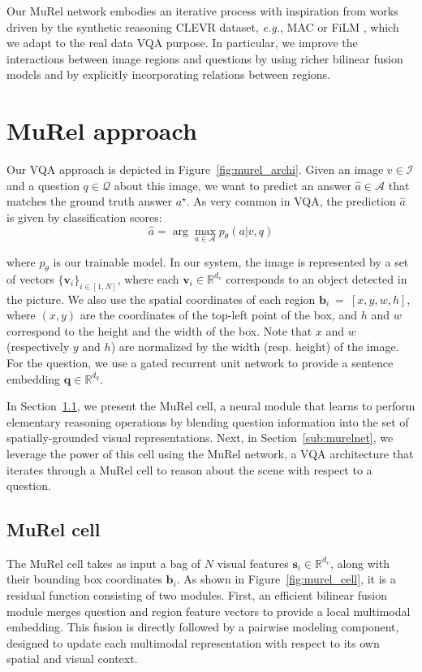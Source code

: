\documentclass[10pt,twocolumn,letterpaper]{article}
\begin{document}
Our MuRel network embodies an iterative process with inspiration from works driven by the synthetic reasoning CLEVR dataset, \textit{e.g.}, MAC \cite{arad2018compositional} or FiLM \cite{perez2018film}, which we adapt to the real data VQA purpose. In particular, we improve the interactions between image regions and questions by using richer bilinear fusion models and by explicitly incorporating relations between regions. \section{MuRel approach}
Our VQA approach is depicted in Figure~\ref{fig:murel_archi}. Given an image $v \in \mathcal{I}$ and a question $q \in \mathcal{Q}$ about this image, we want to predict an answer $\hat{a} \in \mathcal{A}$ that matches the ground truth answer $a^\star$. As very common in VQA, the prediction $\hat{a}$ is given by classification scores:
\begin{equation}
    \hat{a} = \arg\!\max_{a \in \mathcal{A}} p_\theta(a | v,q)
\end{equation}

where $p_\theta$ is our trainable model. In our system, the image is represented by a set of vectors $\{\bm{v}_i \}_{i\in[1,N]}$, where each $\bm{v}_i \in \mathbb{R}^{d_v}$ corresponds to an object detected in the picture. We also use the spatial coordinates of each region $\bm{b}_i~=~[x, y, w, h]$, where $(x,y)$ are the coordinates of the top-left point of the box, and $h$ and $w$ correspond to the height and the width of the box. Note that $x$ and $w$ (respectively $y$ and $h$) are normalized by the width (resp. height) of the image.
For the question, we use a gated recurrent unit network to provide a sentence embedding $\bm{q} \in \mathbb{R}^{d_q}$. 

In Section~\ref{sub:MuRelcell}, we present the MuRel cell, a neural module that learns to perform elementary reasoning operations by blending question information into the set of spatially-grounded visual representations. Next, in Section~\ref{sub:murelnet}, we leverage the power of this cell using the MuRel network, a VQA architecture that iterates through a MuRel cell to reason about the scene with respect to a question.

\subsection{MuRel cell}
\label{sub:MuRelcell}

The MuRel cell takes as input a bag of $N$ visual features $\bm{s}_i \in \mathbb{R}^{d_v}$, along with their bounding box coordinates $\bm{b}_i$.
As shown in Figure~\ref{fig:murel_cell}, it is a residual function consisting of two modules. First, an efficient bilinear fusion module merges question and region feature vectors to provide a local multimodal embedding. This fusion is directly followed by a pairwise modeling component, designed to update each multimodal representation with respect to its own spatial and visual context.
\end{document}
